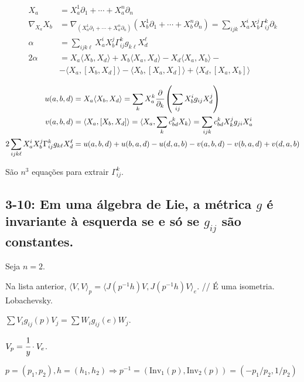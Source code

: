 \documentclass[12pt]{article}
\begin{document}
		\begin{align}
		X_a &= X_a^1 \partial_1 + \cdots + X_a^n \partial_n \\
		\nabla_{X_a} X_b &= \nabla_{(X_a^1 \partial_1 + \cdots + X_a^n \partial_n)} (X_b^1 \partial_1 + \cdots + X_b^n \partial_n) = \sum_{ijk} X_a^i X_b^j \Gamma_{ij}^k \partial_k \\
		\alpha &= \sum_{ijk\ell} X_a^i X_b^j \Gamma_{ij}^k g_{k\ell} X_d^\ell \\
		2 \alpha &= X_a\langle X_b,X_d\rangle + X_b\langle X_a,X_d\rangle - X_d\langle X_a,X_b\rangle -\\
		&- \langle X_a, [X_b,X_d]\rangle - \langle X_b, [X_a,X_d]\rangle + \langle X_d, [X_a,X_b]\rangle
		\end{align}

		\begin{align}
		u(a, b, d) &= X_a\langle X_b,X_d\rangle = \sum_k X_a^k \cfrac{\partial}{\partial_k} \left( \sum_{ij} X_b^i g_{ij} X_d^j \right) \\
		v(a,b,d) &= \langle X_a, [X_b,X_d]\rangle = \langle X_a, \sum_k c_{bd}^k X_k\rangle = \sum_{ijk} c_{bd}^k X_k^j g_{ji} X_a^i \\
		2 \sum_{ijk\ell} X_a^i X_b^j \Gamma_{ij}^k g_{k\ell} X_d^\ell &= u(a,b,d) + u(b,a,d) - u(d,a,b) - v(a,b,d) - v(b,a,d) + v(d,a,b)
		\end{align}

		S\~ao $n^3$ equa\c{c}\~oes para extrair $\Gamma_{ij}^k$.

		\subsection{3-10: Em uma \'algebra de Lie, a m\'etrica $g$ \'e invariante \`a esquerda se e s\'o se $g_{ij}$ s\~ao constantes.}
		\begin{flushright}
		\end{flushright}

	  Seja $n = 2$.

		\vspace{3mm}

		Na lista anterior, $\langle V, V\rangle_p = \langle J(p^{-1}h) V, J(p^{-1}h) V \rangle_e$. // \'E uma isometria. Lobachevsky.

		$\sum V_i g_{ij}(p) V_j = \sum W_i g_{ij}(e) W_j$.

		$V_p = \cfrac{1}{y} \cdot V_e$.

		$p = (p_1,p_2), h = (h_1,h_2) \Rightarrow p^{-1} = (\text{Inv}_1(p), \text{Inv}_2(p)) = (-p_1/p_2, 1/p_2)$
\end{document}
